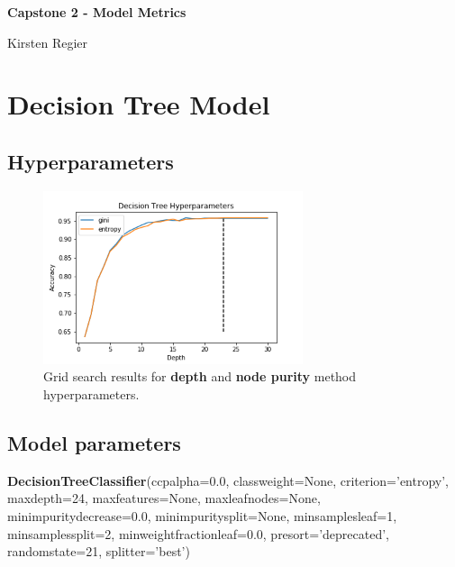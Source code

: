 \documentclass[11pt, letterpaper]{article}
\begin{document}
\begin{center}
\Large{\textbf{Capstone 2 - Model Metrics}}

\large{Kirsten Regier}
\end{center}

\section{Decision Tree Model}
\subsection{Hyperparameters}
\begin{figure}[h]
\begin{center}
\includegraphics[width=3in]{DTHyperparameters.png}
\caption{Grid search results for \textbf{depth} and \textbf{node purity} method hyperparameters.} 
\label{fig:DTHyper}
\end{center}
\end{figure}

\subsection{Model parameters}
\noindent \textbf{DecisionTreeClassifier}(ccp\textunderscore alpha=0.0, class\textunderscore weight=None, criterion='entropy', max\textunderscore depth=24, \newline max\textunderscore features=None, max\textunderscore leaf\textunderscore nodes=None, min\textunderscore impurity\textunderscore decrease=0.0, min\textunderscore impurity\textunderscore split=None, min\textunderscore samples\textunderscore leaf=1, min\textunderscore samples\textunderscore split=2, min\textunderscore weight\textunderscore fraction\textunderscore leaf=0.0, presort='deprecated', random\textunderscore state=21, splitter='best')
\end{document}
